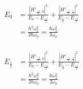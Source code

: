 \documentclass[10pt]{article} %
\begin{document}
\begin{align*}
  E_{0} &=
  \frac{|H'_{\frac{-1}{2},0}|^2}{E_{0} - E_{\frac{-1}{2}}} +
  \frac{|H'_{\frac{-1}{2},\frac{1}{2}}|^2}{E_{\frac{1}{2}} - E_{\frac{-1}{2}}}\\
  &= \frac{\hbar^2\omega_2^2}{2\hbar\omega_0}
  = \frac{\hbar\omega_2^2}{2\omega_0}\\
\end{align*}

\begin{align*}
  E_{\frac{1}{2}} &=
  \frac{|H'_{\frac{-1}{2},0}|^2}{E_{0} - E_{\frac{-1}{2}}} +
  \frac{|H'_{\frac{-1}{2},\frac{1}{2}}|^2}{E_{\frac{1}{2}} - E_{\frac{-1}{2}}}\\
  &= \frac{\hbar^2\omega_2^2}{2\hbar\omega_0}
  = \frac{\hbar\omega_2^2}{2\omega_0}\\
\end{align*}
\end{document}

